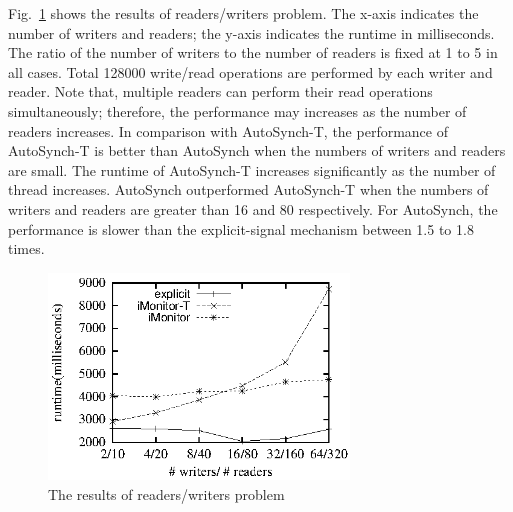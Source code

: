 \documentclass[preprint]{sigplanconf}
\begin{document}

Fig.~\ref{fig:rw_eval} shows the results of readers/writers problem. The
x-axis indicates the number of writers and readers; the y-axis indicates the
runtime in milliseconds. The ratio of the number of writers to the number of
readers is fixed at 1 to 5 in all cases. Total 128000 write/read operations are
performed by each writer and reader. Note that, multiple readers can perform
their read operations simultaneously; therefore, the performance may increases
as the number of readers increases. In comparison with AutoSynch-T, the
performance of AutoSynch-T is better than AutoSynch when the numbers of writers
and readers are small. The runtime of AutoSynch-T increases significantly as 
the number of thread increases. AutoSynch outperformed AutoSynch-T when the
numbers of writers and readers are greater than 16 and 80 respectively. For 
AutoSynch, the performance is slower than the explicit-signal mechanism between 
1.5 to 1.8 times.


\begin{figure}[ht!]
  \centering
  \includegraphics[width=80mm]{fig/trw.eps}
  \caption{The results of readers/writers problem}
  \label{fig:rw_eval}
\end{figure}
\end{document}
